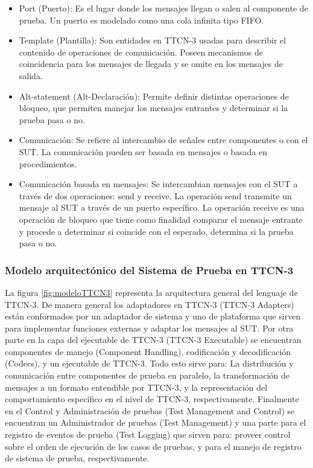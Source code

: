 \begin{itemize}
\begin{itemize}
la prueba.
\item Fail: Indica que el SUT no cumpli\'o con el prop\'osito de la prueba.
\item Error: Esta asignaci\'on la hace el ambiente de ejecuci\'on de TTCN-3 
cuando hay fallas en el componente de pruebas o en el SUT.
\item None: Es el valor inicial, cuando el veredicto no ha sido asignado.
\end{itemize}
\item Port (Puerto): Es el lugar donde los mensajes llegan o salen al 
componente de prueba. Un puerto es modelado como una cola infinita tipo FIFO.
\item Template (Plantilla): Son entidades en TTCN-3 usadas para describir el 
contenido de operaciones de comunicaci\'on. Poseen mecanismos de coincidencia 
para los mensajes de llegada y se omite en los mensajes de salida.
\item Alt-statement (Alt-Declaraci\'on): Permite definir distintas operaciones 
de bloqueo, que permiten manejar los mensajes entrantes y determinar si la 
prueba pasa o no.
\item Comunicaci\'on: Se refiere al intercambio de se\~nales entre componentes 
o con el SUT. La comunicaci\'on pueden ser basada en mensajes o basada en 
procedimientos.
\item Comunicaci\'on basada en mensajes: Se intercambian mensajes  con el SUT 
a trav\'es de dos operaciones: send y receive. La operaci\'on send transmite un 
mensaje al SUT a trav\'es de un puerto espec\'ifico. La operaci\'on receive  es 
una operaci\'on de bloqueo que tiene como finalidad comparar el mensaje entrante 
y procede a determinar si coincide con el esperado, determina si 
la prueba pasa o no.
\end{itemize}

\subsubsection{Modelo arquitect\'onico del Sistema de Prueba en TTCN-3}

La figura \ref{fig:modeloTTCN3} representa la arquitectura general del lenguaje 
de TTCN-3. De manera general los adaptadores en TTCN-3 (TTCN-3 Adapters) est\'an 
conformados por un adaptador de sistema y uno de plataforma que sirven para 
implementar funciones externas y adaptar los mensajes al SUT. Por otra parte en 
la capa del ejecutable de TTCN-3 (TTCN-3 Executable) se encuentran componentes 
de manejo (Component Handling), codificaci\'on y decodificaci\'on (Codecs), y 
un ejecutable de TTCN-3. Todo esto sirve para: La distribuci\'on y 
comunicaci\'on entre componentes de prueba en paralelo, la transformaci\'on de 
mensajes a un formato entendible por TTCN-3, y la representaci\'on del 
comportamiento espec\'ifico en el nivel de TTCN-3, respectivamente. Finalmente 
en el Control y Administraci\'on de pruebas (Test Management and Control) se 
encuentran un Administrador de pruebas (Test Management) y una parte para el 
registro de eventos de prueba (Test Logging) que sirven para: proveer control 
sobre el orden de ejecuci\'on de los casos de pruebas, y para el manejo de 
registro de sistema de prueba, respectivamente.

